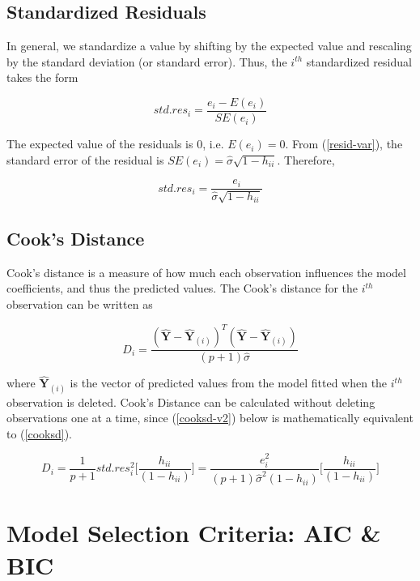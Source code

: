 \documentclass[]{book}
\begin{document}
\section{Standardized Residuals}\label{standardized-residuals}

In general, we standardize a value by shifting by the expected value and
rescaling by the standard deviation (or standard error). Thus, the
\(i^{th}\) standardized residual takes the form

\[std.res_i = \frac{e_i - E(e_i)}{SE(e_i)}\]

The expected value of the residuals is 0, i.e. \(E(e_i) = 0\). From
(\ref{resid-var}), the standard error of the residual is
\(SE(e_i) = \hat{\sigma}\sqrt{1-h_{ii}}\). Therefore,

\begin{equation}
\label{std.resid.}
std.res_i = \frac{e_i}{\hat{\sigma}\sqrt{1-h_{ii}}}
\end{equation}

\section{Cook's Distance}\label{cooks-distance}

Cook's distance is a measure of how much each observation influences the
model coefficients, and thus the predicted values. The Cook's distance
for the \(i^{th}\) observation can be written as

\begin{equation}
\label{cooksd}
D_i = \frac{(\hat{\mathbf{Y}} -\hat{\mathbf{Y}}_{(i)})^T(\hat{\mathbf{Y}} -\hat{\mathbf{Y}}_{(i)})}{(p+1)\hat{\sigma}}
\end{equation}

where \(\hat{\mathbf{Y}}_{(i)}\) is the vector of predicted values from
the model fitted when the \(i^{th}\) observation is deleted. Cook's
Distance can be calculated without deleting observations one at a time,
since (\ref{cooksd-v2}) below is mathematically equivalent to
(\ref{cooksd}).

\begin{equation}
\label{cooksd-v2}
D_i = \frac{1}{p+1}std.res_i^2\Bigg[\frac{h_{ii}}{(1-h_{ii})}\Bigg] = \frac{e_i^2}{(p+1)\hat{\sigma}^2(1-h_{ii})}\Bigg[\frac{h_{ii}}{(1-h_{ii})}\Bigg]
\end{equation}

\chapter{Model Selection Criteria: AIC \&
BIC}\label{model-selection-criteria-aic-bic}
\end{document}
